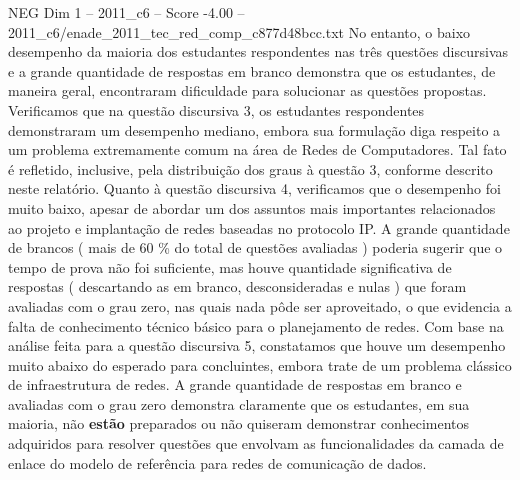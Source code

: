 \begin{textsample}{NEG Dim 1 – 2011\_c6 – Score -4.00 – 2011\_c6/enade\_2011\_tec\_red\_comp\_c877d48bcc.txt}
No entanto, o baixo desempenho da maioria dos estudantes respondentes nas três questões discursivas e a grande quantidade de respostas em branco demonstra que os estudantes, de maneira geral, encontraram dificuldade para solucionar as questões propostas.
Verificamos que na questão discursiva 3, os estudantes respondentes demonstraram um desempenho mediano, embora sua formulação diga respeito a um problema extremamente comum na área de Redes de Computadores.
Tal fato é refletido, inclusive, pela distribuição dos graus à questão 3, conforme descrito neste relatório.
Quanto à questão discursiva 4, verificamos que o desempenho foi muito baixo, apesar de abordar um dos assuntos mais importantes relacionados ao projeto e implantação de redes baseadas no protocolo IP.
A grande quantidade de brancos ( mais de 60 \% do total de questões avaliadas ) poderia sugerir que o tempo de prova não foi suficiente, mas houve quantidade significativa de respostas ( descartando as em branco, desconsideradas e nulas ) que foram avaliadas com o grau zero, nas quais nada pôde ser aproveitado, o que evidencia a falta de conhecimento técnico básico para o planejamento de redes.
Com base na análise feita para a questão discursiva 5, constatamos que houve um desempenho muito abaixo do esperado para concluintes, embora trate de um problema clássico de infraestrutura de redes.
A grande quantidade de respostas em branco e avaliadas com o grau zero demonstra claramente que os estudantes, em sua maioria, não \textbf{estão} preparados ou não quiseram demonstrar conhecimentos adquiridos para resolver questões que envolvam as funcionalidades da camada de enlace do modelo de referência para redes de comunicação de dados.

\end{textsample}
